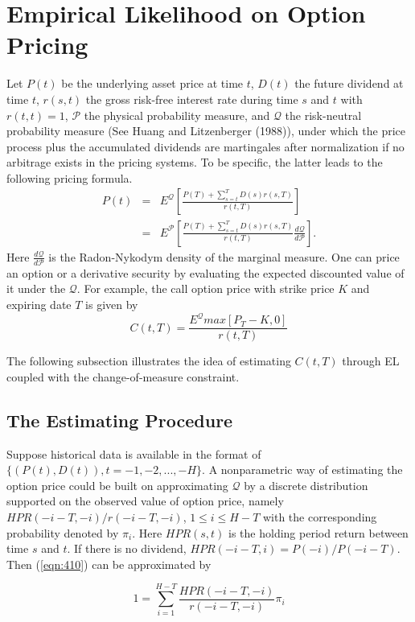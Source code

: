 \section{Empirical Likelihood on Option Pricing}
Let $P(t)$ be the underlying asset price at time $t$, $D(t)$  the future dividend at time $t$, $r(s,t)$ the gross risk-free interest rate during time $s$ and $t$ with $r(t,t)=1$,  $\mathcal{P}$ the physical probability measure, and $\mathcal{Q}$  the risk-neutral probability measure (See Huang and Litzenberger  (1988)), under which the price process plus the accumulated dividends are martingales after normalization if no arbitrage exists in the pricing systems. To be specific, the latter leads to the following pricing formula.
\begin{eqnarray}
P(t)&=&E^{\mathcal{Q}}[\frac{P(T)+\sum_{s=t}^{T}D(s)r(s,T)}{r(t,T)}]\label{eqn:410}\\
&=&E^{\mathcal{P}}[\frac{P(T)+\sum_{s=t}^{T}D(s)r(s,T)}{r(t,T)}\frac{d\mathcal{Q}}{d\mathcal{P}}].\nonumber
\end{eqnarray}
Here $\frac{d\mathcal{Q}}{d\mathcal{P}}$ is the Radon-Nykodym density of the marginal measure. One can price an option or a derivative security by evaluating the expected discounted value of it under the $\mathcal{Q}$. For example, the call option price with strike price $K$ and expiring date $T$ is given by
\begin{equation}\label{eqn:4102}
C(t,T)=\frac{E ^{\mathcal{Q}}  max[P_T - K,0]   }{r(t,T)} 
\end{equation} 

The following subsection illustrates the idea of estimating $C(t,T)$  through EL coupled with the change-of-measure constraint. 

\subsection{The Estimating Procedure}
Suppose historical data is available in the format of $\{(P(t),D(t)),t=-1,-2,...,-H\}$. A nonparametric way of estimating the option price could be built on approximating $\mathcal{Q}$ by a discrete distribution supported on the observed value of option price, namely $HPR(-i-T,-i)/r(-i-T,-i)$, $1\leq i\leq H-T$ with the corresponding probability denoted by $\pi_i$. Here $HPR(s,t)$ is the holding period return between time $s$ and $t$. If there is no dividend, $HPR(-i-T,i)=P(-i)/P(-i-T)$. Then (\ref{eqn:410}) can be approximated by 

\begin{equation}\label{eqn:4103}
1=\sum_{i=1}^{H-T} \frac{HPR(-i-T,-i)}{r(-i-T,-i)}\pi_i
\end{equation}

